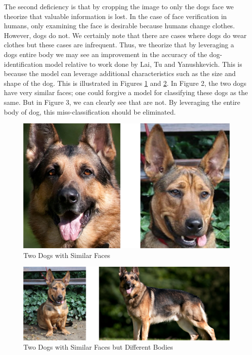 \documentclass{article}
\begin{document}
The second deficiency is that by cropping the image to only the dogs face we theorize that valuable information is lost.  In the case of face verification in humans, only examining the face is desirable because humans change clothes.  However, dogs do not.  We certainly note that there are cases where dogs do wear clothes but these cases are infrequent.  Thus, we theorize that by leveraging a dogs entire body we may see an improvement in the accuracy of the dog-identification model relative to work done by  Lai, Tu and Yanushkevich.  This is because the model can leverage additional characteristics such as the size and shape of the dog.  This is illustrated in Figures \ref{fig:x similar faces} and \ref{fig:x different bodies}.  In Figure 2, the two dogs have very similar faces; one could forgive a model for classifying these dogs as the same.  But in Figure 3, we can clearly see that are not.  By leveraging the entire body of dog, this miss-classification should be eliminated.

\begin{figure}[h]
\centering
	\includegraphics{final-report-images/similar_faces.png}
\caption{Two Dogs with Similar Faces}
\label{fig:x similar faces}
\end{figure}


\begin{figure}[h]
\centering
	\includegraphics{final-report-images/different_bodies.png}
\caption{Two Dogs with Similar Faces but Different Bodies}
\label{fig:x different bodies}
\end{figure}
\end{document}
